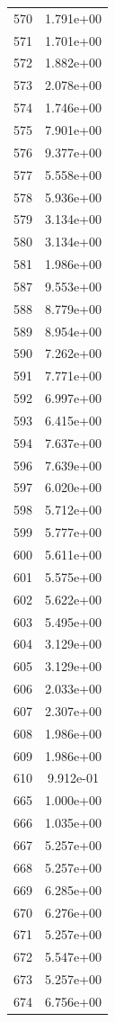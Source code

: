 \documentclass[12pt]{article}
\begin{document}
\begin{longtable}{@{}cc@{}}
570 & 1.791e+00 \\
571 & 1.701e+00 \\
572 & 1.882e+00 \\
573 & 2.078e+00 \\
574 & 1.746e+00 \\
575 & 7.901e+00 \\
576 & 9.377e+00 \\
577 & 5.558e+00 \\
578 & 5.936e+00 \\
579 & 3.134e+00 \\
580 & 3.134e+00 \\
581 & 1.986e+00 \\
587 & 9.553e+00 \\
588 & 8.779e+00 \\
589 & 8.954e+00 \\
590 & 7.262e+00 \\
591 & 7.771e+00 \\
592 & 6.997e+00 \\
593 & 6.415e+00 \\
594 & 7.637e+00 \\
596 & 7.639e+00 \\
597 & 6.020e+00 \\
598 & 5.712e+00 \\
599 & 5.777e+00 \\
600 & 5.611e+00 \\
601 & 5.575e+00 \\
602 & 5.622e+00 \\
603 & 5.495e+00 \\
604 & 3.129e+00 \\
605 & 3.129e+00 \\
606 & 2.033e+00 \\
607 & 2.307e+00 \\
608 & 1.986e+00 \\
609 & 1.986e+00 \\
610 & 9.912e-01 \\
665 & 1.000e+00 \\
666 & 1.035e+00 \\
667 & 5.257e+00 \\
668 & 5.257e+00 \\
669 & 6.285e+00 \\
670 & 6.276e+00 \\
671 & 5.257e+00 \\
672 & 5.547e+00 \\
673 & 5.257e+00 \\
674 & 6.756e+00 \\

\end{longtable}
\end{document}
